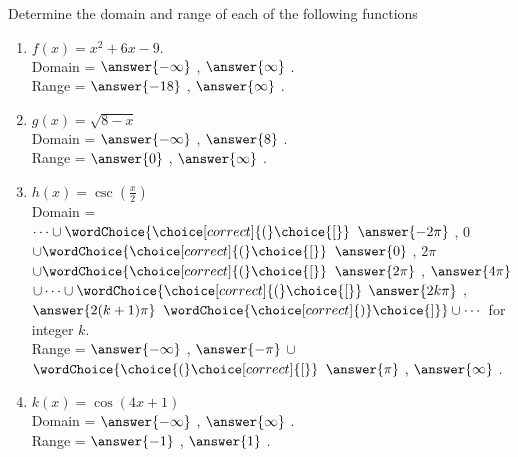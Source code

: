 \documentclass{ximera}
\author{Elizabeth Campolongo}
\begin{document}
\begin{exercise}
Determine the domain and range of each of the following functions
%
\begin{enumerate}

\item $f(x) = x^2+6x-9.$\\
Domain = \wordChoice{\choice[correct]{(}\choice{[}} $\answer{-\infty}$ , $\answer{\infty}$ \wordChoice{\choice[correct]{)}\choice{]}}.\\
Range = \wordChoice{\choice{(}\choice[correct]{[}} $\answer{-18}$ , $\answer{\infty}$ \wordChoice{\choice[correct]{)}\choice{]}}.


\item $g(x) = \sqrt{8-x} $\\
Domain = \wordChoice{\choice[correct]{(}\choice{[}} $\answer{-\infty}$ , $\answer{8}$ \wordChoice{\choice{)}\choice[correct]{]}}.\\
Range = \wordChoice{\choice{(}\choice[correct]{[}} $\answer{0}$ , $\answer{\infty}$ \wordChoice{\choice[correct]{)}\choice{]}}.


\item $h(x) = \csc\!\left(\frac{x}{2}\right)$\\
Domain = \\
$\cdots \cup
\wordChoice{\choice[correct]{(}\choice{[}}$ $\answer{-2\pi}$ , 0 \wordChoice{\choice[correct]{)}\choice{]}} 
$\cup 
\wordChoice{\choice[correct]{(}\choice{[}}$ $\answer{0}$ , $2\pi$ \wordChoice{\choice[correct]{)}\choice{]}} 
$\cup 
\wordChoice{\choice[correct]{(}\choice{[}}$ $\answer{2\pi}$ , $\answer{4\pi}$ \wordChoice{\choice[correct]{)}\choice{]}} 
$\cup \cdots \cup
\wordChoice{\choice[correct]{(}\choice{[}}$ $\answer{2k\pi}$ , $\answer{2(k+1)\pi}$ $\wordChoice{\choice[correct]{)}\choice{]}}
\cup \cdots$ for integer $k$.
\\
Range = \wordChoice{\choice[correct]{(}\choice{[}} 
$\answer{-\infty}$ , $\answer{-\pi}$ 
\wordChoice{\choice{)}\choice[correct]{]}} 
$\cup$  
$\wordChoice{\choice{(}\choice[correct]{[}}$ 
$\answer{\pi}$ , $\answer{\infty}$ 
\wordChoice{\choice[correct]{)}\choice{]}}.

\item $k(x) = \cos(4x+1)$ \\
Domain = \wordChoice{\choice[correct]{(}\choice{[}} 
$\answer{-\infty}$ , $\answer{\infty}$ 
\wordChoice{\choice[correct]{)}\choice{]}}.\\
Range = \wordChoice{\choice{(}\choice[correct]{[}} $\answer{-1}$ , $\answer{1}$ \wordChoice{\choice{)}\choice[correct]{]}}.



\end{enumerate}
\end{exercise}
\end{document}
